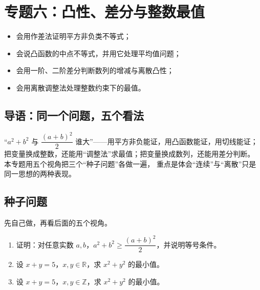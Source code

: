 \section{专题六：凸性、差分与整数最值}

\begin{learnobjective}
\begin{itemize}
  \item 会用作差法证明平方非负类不等式；
  \item 会说凸函数的中点不等式，并用它处理平均值问题；
  \item 会用一阶、二阶差分判断数列的增减与离散凸性；
  \item 会用离散调整法处理整数约束下的最值。
\end{itemize}
\end{learnobjective}

\begin{preview}
\subsection{导语：同一个问题，五个看法}
“$a^2+b^2$ 与 $\dfrac{(a+b)^2}{2}$ 谁大”——用平方非负能证，用凸函数能证，用切线能证；
把变量换成整数，还能用“调整法”求最值；把变量换成数列，还能用差分判断。
本专题用五个视角把三个“种子问题”各做一遍，
重点是体会“连续”与“离散”只是同一思想的两种表现。

\subsection{种子问题}
先自己做，再看后面的五个视角。
\begin{enumerate}
  \item 证明：对任意实数 $a,b$，$a^2+b^2\geq\dfrac{(a+b)^2}{2}$，并说明等号条件。
  \item 设 $x+y=5$，$x,y\in\mathbb{R}$，求 $x^2+y^2$ 的最小值。
  \item 设 $x+y=5$，$x,y\in\mathbb{Z}$，求 $x^2+y^2$ 的最小值。
\end{enumerate}
\end{preview}

